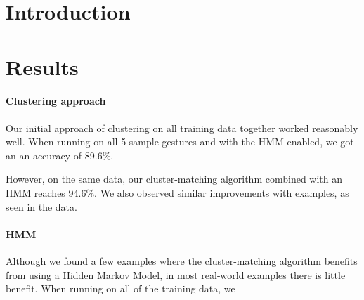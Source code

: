 \documentclass[12pt]{article}
\begin{document}
\maketitle


\section{Introduction}

\section{Results}\label{results}
\paragraph{Clustering approach}
Our initial approach of clustering on all training data together
worked reasonably well.  When running on all 5 sample gestures and
with the HMM enabled, we got an an accuracy of 89.6\%.

However, on the same data, our cluster-matching algorithm combined with
an HMM reaches 94.6\%.  We also observed similar improvements with examples,
as seen in the data.

\paragraph{HMM}
Although we found a few examples where the cluster-matching algorithm
benefits from using a Hidden Markov Model, in most real-world examples
there is little benefit.  When running on all of the training data,
we 
\end{document}
